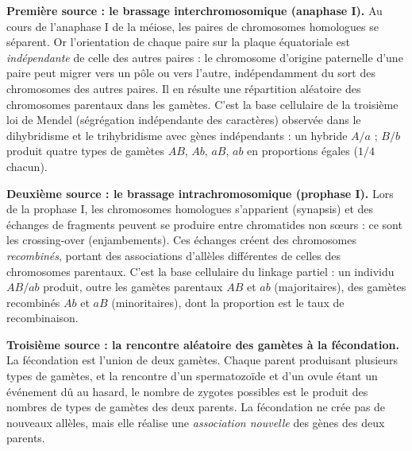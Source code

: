 \documentclass[11pt]{article}
\newcommand{\cle}[1]{{\popxbold\color{popdark}#1}}
\begin{document}
\textbf{Première source : le brassage interchromosomique (anaphase I).} Au cours de l'anaphase I de la méiose, les paires de chromosomes homologues se séparent. Or l'orientation de chaque paire sur la plaque équatoriale est \emph{indépendante} de celle des autres paires : le chromosome d'origine paternelle d'une paire peut migrer vers un pôle ou vers l'autre, indépendamment du sort des chromosomes des autres paires. Il en résulte une répartition aléatoire des chromosomes parentaux dans les gamètes. C'est la base cellulaire de la \cle{troisième loi de Mendel} (ségrégation indépendante des caractères) observée dans le dihybridisme et le trihybridisme avec gènes indépendants : un hybride $A/a$ ; $B/b$ produit quatre types de gamètes $AB$, $Ab$, $aB$, $ab$ en proportions égales ($1/4$ chacun).

\textbf{Deuxième source : le brassage intrachromosomique (prophase I).} Lors de la prophase I, les chromosomes homologues s'apparient (synapsis) et des échanges de fragments peuvent se produire entre chromatides non s\oe urs : ce sont les \cle{crossing-over} (enjambements). Ces échanges créent des chromosomes \emph{recombinés}, portant des associations d'allèles différentes de celles des chromosomes parentaux. C'est la base cellulaire du \cle{linkage partiel} : un individu $AB/ab$ produit, outre les gamètes parentaux $AB$ et $ab$ (majoritaires), des gamètes recombinés $Ab$ et $aB$ (minoritaires), dont la proportion est le taux de recombinaison.

\textbf{Troisième source : la rencontre aléatoire des gamètes à la fécondation.} La fécondation est l'union de deux gamètes. Chaque parent produisant plusieurs types de gamètes, et la rencontre d'un spermatozoïde et d'un ovule étant un événement dû au hasard, le nombre de zygotes possibles est le produit des nombres de types de gamètes des deux parents. La fécondation ne crée pas de nouveaux allèles, mais elle réalise une \emph{association nouvelle} des gènes des deux parents.
\end{document}
